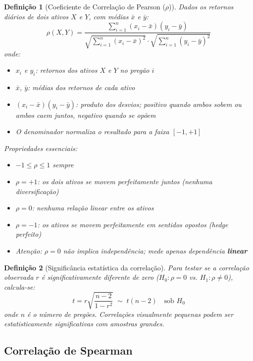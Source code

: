 \documentclass[11pt,a4paper]{article}
\theoremstyle{quant}
\newtheorem{definicao}{Definição}[section]
\begin{document}
\begin{definicao}[Coeficiente de Correlação de Pearson ($\rho$)]
Dados os retornos diários de dois ativos $X$ e $Y$, com médias $\bar{x}$ e $\bar{y}$:
\[
  \rho(X, Y) = \frac{\displaystyle\sum_{i=1}^{n}(x_i - \bar{x})(y_i - \bar{y})}
                    {\displaystyle\sqrt{\sum_{i=1}^{n}(x_i - \bar{x})^2}
                     \cdot\sqrt{\sum_{i=1}^{n}(y_i - \bar{y})^2}}
\]
onde:
\begin{itemize}
  \item $x_i$ e $y_i$: retornos dos ativos $X$ e $Y$ no pregão $i$
  \item $\bar{x}$, $\bar{y}$: médias dos retornos de cada ativo
  \item $(x_i - \bar{x})(y_i - \bar{y})$: produto dos desvios; positivo quando
        ambos sobem ou ambos caem juntos, negativo quando se opõem
  \item O denominador normaliza o resultado para a faixa $[-1, +1]$
\end{itemize}

Propriedades essenciais:
\begin{itemize}
  \item $-1 \leq \rho \leq 1$ sempre
  \item $\rho = +1$: os dois ativos se movem perfeitamente juntos (nenhuma diversificação)
  \item $\rho = 0$: nenhuma relação \emph{linear} entre os ativos
  \item $\rho = -1$: os ativos se movem perfeitamente em sentidos opostos (hedge perfeito)
  \item Atenção: $\rho = 0$ não implica independência; mede apenas dependência \textbf{linear}
\end{itemize}
\end{definicao}

\begin{definicao}[Significância estatística da correlação]
Para testar se a correlação observada $r$ é significativamente diferente de zero
($H_0: \rho = 0$ vs. $H_1: \rho \neq 0$), calcula-se:
\[
  t = r\sqrt{\frac{n-2}{1-r^2}} \;\sim\; t(n-2) \quad \text{sob } H_0
\]
onde $n$ é o número de pregões. Correlações visualmente pequenas podem ser
estatisticamente significativas com amostras grandes.
\end{definicao}

\subsection{Correlação de Spearman}
\end{document}
